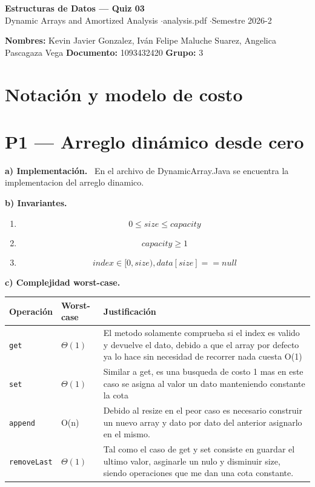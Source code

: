 \documentclass[11pt,a4paper]{article}
\newcommand{\sub}[2]{\medskip\par\noindent\textbf{#1) #2.}\ }
\begin{document}
\begin{center}
{\Large\bfseries Estructuras de Datos --- Quiz 03}\\[1pt]
{\large Dynamic Arrays and Amortized Analysis} \quad$\cdot$\quad analysis.pdf \quad$\cdot$\quad Semestre 2026-2
\end{center}
\vspace{-6pt}
\textbf{Nombres:} Kevin Javier Gonzalez, Iván Felipe Maluche Suarez, Angelica Pascagaza Vega \hfill \textbf{Documento:} 1093432420 \hfill \textbf{Grupo:} 3

\section*{Notación y modelo de costo}

\section*{P1 --- Arreglo dinámico desde cero}

\sub{a}{Implementación}
En el archivo de DynamicArray.Java se encuentra la implementacion del arreglo dinamico.

\sub{b}{Invariantes}

\begin{enumerate}[label=\textbf{I\arabic*.}]
\item $$0 \leq size \leq capacity$$
\item $$ capacity \geq 1$$
\item $$ index \in [0, size), data[size] == null $$
\end{enumerate}


\sub{c}{Complejidad worst-case}\par\smallskip
\renewcommand{\arraystretch}{2}
\begin{tabular}{@{}L{0.16\textwidth}L{0.2\textwidth}L{0.55\textwidth}@{}}
\toprule
Operación & Worst-case & Justificación\\
\midrule
\texttt{get}       & $\Theta(1)$  & El metodo solamente comprueba si el index es valido y devuelve el dato, debido a que el array por defecto ya lo hace sin necesidad de recorrer nada cuesta O(1) \\ 
\texttt{set}        & $\Theta(1)$ & Similar a get, es una busqueda de costo 1 mas en este caso se asigna al valor un dato manteniendo constante la cota\\
\texttt{append}     & O(n) & Debido al resize en el peor caso es necesario construir un nuevo array y dato por dato del anterior asignarlo en el mismo.\\
\texttt{removeLast} & $\Theta(1)$ & Tal como el caso de get y set consiste en guardar el ultimo valor, asginarle un nulo y disminuir size, siendo operaciones que me dan una cota constante.\\
\bottomrule
\end{tabular}
\renewcommand{\arraystretch}{1}
\end{document}
